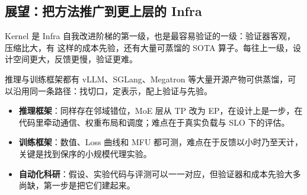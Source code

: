 \subsection{展望：把方法推广到更上层的 Infra}\label{sec:infra-rsi}
Kernel 是 Infra 自我改进阶梯的第一级，也是最容易验证的一级：验证器客观，压缩比大，有  这样的成本先验，还有大量可蒸馏的 SOTA 算子。每往上一级，设计空间更大，反馈更慢，验证更难。


\begin{DiagramBlock}
\end{DiagramBlock}
推理与训练框架都有 vLLM、SGLang、Megatron 等大量开源产物可供蒸馏，可以沿用同一条路径：找切口，定表示，配上验证与先验。


\begin{itemize}
\item
\textbf{推理框架}：同样存在邻域错位，MoE 层从 TP 改为 EP，在设计上是一步，在代码里牵动通信、权重布局和调度；难点在于真实负载与 SLO 下的评估。


\item
\textbf{训练框架}：数值、Loss 曲线和 MFU 都可测，难点在于反馈以小时乃至天计，关键是找到保序的小规模代理实验。


\item
\textbf{自动化科研}：假设、实验代码与评测可以一一对应，但验证器和成本先验大多尚缺，第一步是把它们建起来。


\end{itemize}

